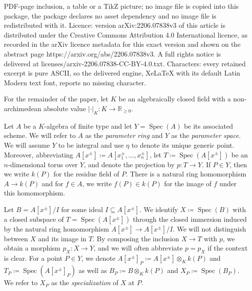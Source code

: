 \documentclass[10pt,a4paper]{amsart}
\DeclareMathOperator{\Spec}{Spec}
\newcommand{\RR}{\mathbb{R}}
\begin{document}
PDF-page inclusion, a table or a TikZ picture; no image file is copied into this package, the package declares no asset dependency and no image file is redistributed with it. Licence: version arXiv:2206.07838v3 of this article is distributed under the Creative Commons Attribution 4.0 International licence, as recorded in the arXiv licence metadata for this exact version and shown on the abstract page https://arxiv.org/abs/2206.07838v3. A full rights notice is delivered at licenses/arxiv-2206.07838-CC-BY-4.0.txt. Characters: every retained excerpt is pure ASCII, so the delivered engine, XeLaTeX with its default Latin Modern text font, reports no missing character.
\begin{notation}\label{con:mainConvention}
  For the remainder of the paper, let $K$ be an algebraically closed field with a non-archimedean absolute value $|\cdot|_K\colon K\rightarrow\RR_{\geq 0}$.

  Let $A$ be a $K$-algebra of finite type and let $Y=\Spec(A)$ be its associated scheme.  We will refer to $A$ as the \emph{parameter ring} and $Y$ as the \emph{parameter space}.  We will assume $Y$ to be integral and use $\eta$ to denote its unique generic point.  Moreover, abbreviating $A[x^\pm]\coloneqq A[x_1^\pm,\dots,x_n^\pm]$, let $T\coloneqq \Spec(A[x^\pm])$ be an $n$-dimensional torus over $Y$, and denote the projection by $p\colon T\rightarrow Y$. If $P\in Y$, then we write $k(P)$ for the residue field of $P$. There is a natural ring homomorphism $A\to k(P)$ and for $f\in{A}$, we write $f(P)\in k(P)$ for the image of $f$ under this homomorphism.

  Let $B=A[x^\pm]/I$ for some ideal $I\subseteq A[x^\pm]$. We identify $X\coloneqq \Spec(B)$ with a closed subspace of $T=\Spec(A[x^{\pm}])$ through the closed immersion induced by the natural ring homomorphism $A[x^{\pm}]\to A[x^{\pm}]/I$. We will not distinguish between $X$ and its image in $T$.  %
  By composing the inclusion $X\to T$ with $p$, we obtain a morphism $p_{X}\colon X\to Y$, and we will often abbreviate $p=p_X$ if the context is clear.
  For a point $P\in Y$, we denote $A[x^\pm]_P\coloneqq A[x^\pm]\otimes_K k(P)$ and $T_P\coloneqq \Spec(A[x^\pm]_P)$ as well as $B_P\coloneqq B\otimes_K k(P)$ and $X_P\coloneqq \Spec(B_P)$. We refer to $X_P$ as the \emph{specialization} of $X$ at $P$.
\end{notation}
\end{document}

